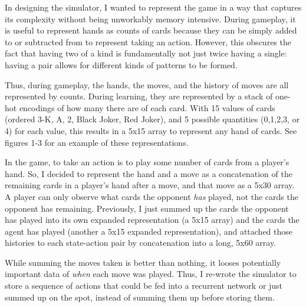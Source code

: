 \documentclass{article}
\begin{document}
In designing the simulator, I wanted to represent the game in a way that captures its complexity without being unworkably memory intensive. During gameplay, it is useful to represent hands as counts of cards because they can be simply added to or subtracted from to represent taking an action. However, this obscures the fact that having two of a kind is fundamentally not just twice having a single: having a pair allows for different kinds of patterns to be formed.

Thus, during gameplay, the hands, the moves, and the history of moves are all represented by counts. During learning, they are represented by a stack of one-hot encodings of how many there are of each card. With 15 values of cards (ordered 3-K, A, 2, Black Joker, Red Joker), and 5 possible quantities (0,1,2,3, or 4) for each value, this results in a 5x15 array to represent any hand of cards. See figures 1-3 for an example of these representations.

In the game, to take an action is to play some number of cards from a player's hand. So, I decided to represent the hand and a move as a concatenation of the remaining cards in a player's hand after a move, and that move as a 5x30 array. A player can only observe what cards the opponent \textit{has} played, not the cards the opponent has remaining. Previously, I just summed up the cards the opponent has played into its own expanded representation (a 5x15 array) and the cards the agent has played (another a 5x15 expanded representation), and attached those histories to each state-action pair by concatenation into a long, 5x60 array.

While summing the moves taken is better than nothing, it looses potentially important data of \textit{when} each move was played. Thus, I re-wrote the simulator to store a sequence of actions that could be fed into a recurrent network or just summed up on the spot, instead of summing them up before storing them.
\end{document}
